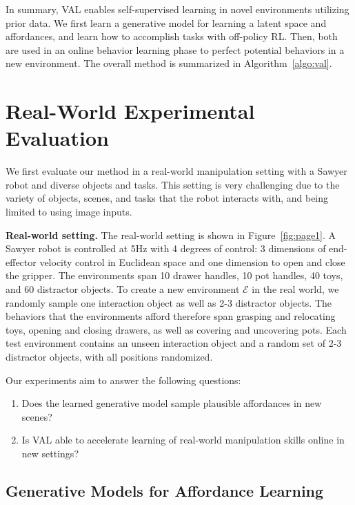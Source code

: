 In summary, VAL enables self-supervised learning in novel environments utilizing prior data. 
We first learn a generative model for learning a latent space and affordances, and learn how to accomplish tasks with off-policy RL. 
Then, both are used in an online behavior learning phase to perfect potential behaviors in a new environment. 
The overall method is summarized in Algorithm~\ref{algo:val}.



\section{Real-World Experimental Evaluation}
\label{sec:result}

We first evaluate our method in a real-world manipulation setting with a Sawyer robot and diverse objects and tasks. This setting is very challenging due to the variety of objects, scenes, and tasks that the robot interacts with, and being limited to using image inputs.

\textbf{Real-world setting.} The real-world setting is shown in Figure~\ref{fig:page1}. A Sawyer robot is controlled at 5Hz with 4 degrees of control: 3 dimensions of end-effector velocity control in Euclidean space and one dimension to open and close the gripper. The environments span 10 drawer handles, 10 pot handles, 40 toys, and 60 distractor objects. To create a new environment $\mathcal{E}$ in the real world, we randomly sample one interaction object as well as 2-3 distractor objects. The behaviors that the environments afford therefore span grasping and relocating toys, opening and closing drawers, as well as covering and uncovering pots. Each test environment contains an unseen interaction object and a random set of 2-3 distractor objects, with all positions randomized.

Our experiments aim to answer the following questions:
\begin{enumerate}
    \item Does the learned generative model sample plausible affordances in new scenes?
    \item Is VAL able to accelerate learning of real-world manipulation skills online in new settings?
\end{enumerate}

\subsection{Generative Models for Affordance Learning}
\label{sec:gen_model_results}

